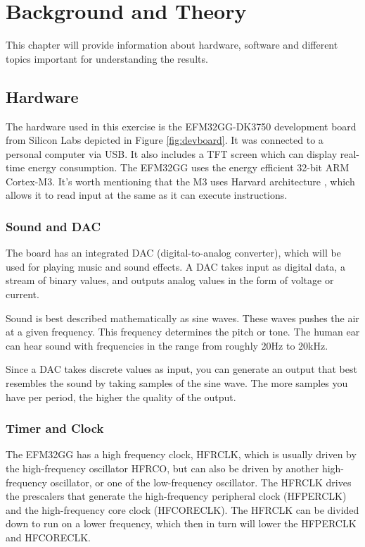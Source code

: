 \chapter{Background and Theory}

This chapter will provide information about hardware, software and different topics important for understanding the results. 

\section{Hardware}
The hardware used in this exercise is the EFM32GG-DK3750 development board from Silicon Labs depicted in Figure \ref{fig:devboard}. It was connected to a personal computer via USB. It also includes a TFT screen which can display real-time energy consumption. The EFM32GG uses the energy efficient 32-bit ARM Cortex-M3. It's worth mentioning that the M3 uses Harvard architecture \cite{cortexm3}, which allows it to read input at the same as it can execute instructions.

\subsection{Sound and DAC}
\label{sec:dac}
The board has an integrated DAC (digital-to-analog converter), which will be used for playing music and sound effects. A DAC takes input as digital data, a stream of binary values, and outputs analog values in the form of voltage or current.

Sound is best described mathematically as sine waves. These waves pushes the air at a given frequency. This frequency determines the pitch or tone. The human ear can hear sound with frequencies in the range from roughly 20Hz to 20kHz.

Since a DAC takes discrete values as input, you can generate an output that best resembles the sound by taking samples of the sine wave. The more samples you have per period, the higher the quality of the output.

\subsection{Timer and Clock}
\label{sec:timer}
The EFM32GG has a high frequency clock, HFRCLK, which is usually driven by the high-frequency oscillator HFRCO, but can also be driven by another high-frequency oscillator, or one of the low-frequency oscillator. The HFRCLK drives the prescalers that generate the high-frequency peripheral clock (HFPERCLK) and the high-frequency core clock (HFCORECLK). The HFRCLK can be divided down to run on a lower frequency, which then in turn will lower the HFPERCLK and HFCORECLK.

